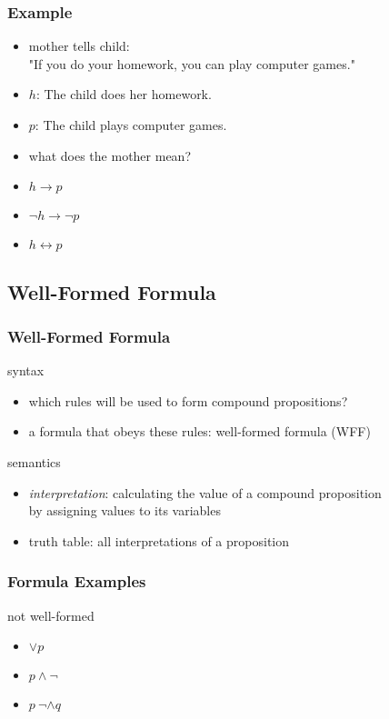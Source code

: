 \documentclass[dvipsnames]{beamer}
\begin{document}
\begin{frame}
  \frametitle{Example}

  \begin{itemize}
    \item mother tells child:\\
      "If you do your homework, you can play computer games."

    \pause
    \medskip
    \item $h$: The child does her homework.
    \item $p$: The child plays computer games.
    \item what does the mother mean?

    \pause
    \medskip
    \item $h \rightarrow p$
    \pause
    \item $\neg h \rightarrow \neg p$
    \pause
    \item $h \leftrightarrow p$
  \end{itemize}
\end{frame}

\subsection{Well-Formed Formula}

\begin{frame}
  \frametitle{Well-Formed Formula}

  syntax
  \begin{itemize}
    \item which rules will be used to form compound propositions?
    \item a formula that obeys these rules: \alert{well-formed formula} (WFF)
  \end{itemize}

  \pause
  \bigskip
  semantics
  \begin{itemize}
    \item \emph{interpretation}: calculating the value of a
      compound proposition\\
      by assigning values to its variables
    \item truth table: all interpretations of a proposition
  \end{itemize}
\end{frame}

\begin{frame}
  \frametitle{Formula Examples}

  \begin{exampleblock}{not well-formed}
    \begin{itemize}
      \item $\vee p$
      \item $p \wedge \neg$
      \item $p~\neg \wedge q$
    \end{itemize}
  \end{exampleblock}
\end{frame}
\end{document}
